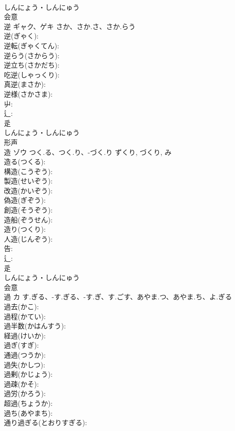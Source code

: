 \documentclass[8pt]{extreport}
\begin{document}
\begin{CJK}{UTF8}{min}
\\	しんにょう・しんにゅう	
\\	会意 
\\	逆	ギャク、ゲキ	さか、さか.さ、さか.らう		
\\	逆(ぎゃく): 
\\	逆転(ぎゃくてん): 
\\	逆らう(さからう): 
\\	逆立ち(さかだち): 
\\	吃逆(しゃっくり): 
\\	真逆(まさか): 
\\	逆様(さかさま): 
\\	屮: 
\\	辶: 
\\	辵	
\\	しんにょう・しんにゅう	
\\	形声 
\\	造	ゾウ	つく.る、つく.り、-づく.り	ずくり, づくり, み	
\\	造る(つくる): 
\\	構造(こうぞう): 
\\	製造(せいぞう): 
\\	改造(かいぞう): 
\\	偽造(ぎぞう): 
\\	創造(そうぞう): 
\\	造船(ぞうせん): 
\\	造り(つくり): 
\\	人造(じんぞう): 
\\	告: 
\\	辶: 
\\	辵	
\\	しんにょう・しんにゅう	
\\	会意 
\\	過	カ	す.ぎる、-す.ぎる、-す.ぎ、す.ごす、あやま.つ、あやま.ち、よ.ぎる		
\\	過去(かこ): 
\\	過程(かてい): 
\\	過半数(かはんすう): 
\\	経過(けいか): 
\\	過ぎ(すぎ): 
\\	通過(つうか): 
\\	過失(かしつ): 
\\	過剰(かじょう): 
\\	過疎(かそ): 
\\	過労(かろう): 
\\	超過(ちょうか): 
\\	過ち(あやまち): 
\\	通り過ぎる(とおりすぎる): 

\end{CJK}
\end{document}
